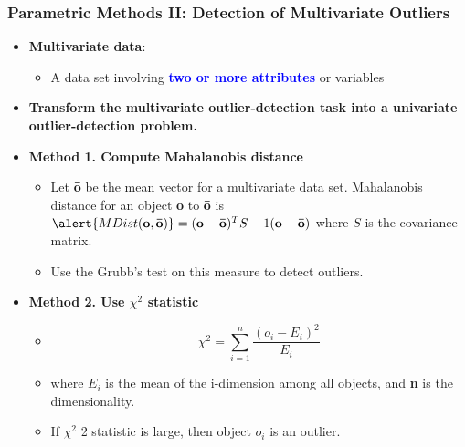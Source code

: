 \documentclass[aspectratio=169,t,xcolor=dvipsnames]{beamer}
\newcommand{\blue}[1]{\textbf{\textcolor{blue}{#1}}}
\begin{document}
\begin{frame}
	\frametitle{Parametric Methods II: Detection of Multivariate Outliers}
	\begin{itemize}
		\item \textbf{Multivariate data}:
		      \begin{itemize}
		      	\item A data set involving \blue{two or more attributes} or variables
		      \end{itemize}
		\item \textbf{Transform the multivariate outlier-detection task into a univariate outlier-detection problem.}
		\item \textbf{Method 1. Compute Mahalanobis distance}
		      \begin{itemize}
		      	\item Let \textbf{\alert{ō}} be the mean vector for a multivariate data set. Mahalanobis distance for an object \textbf{\alert{o}} to \textbf{ō} is $\alert{MDist(\textbf{o}, \textbf{ō})} = (\textbf{o} - \textbf{ō})^T S-1 (\textbf{o} - \textbf{ō})$ where $S$ is the covariance matrix.
		      	\item Use the Grubb's test on this measure to detect outliers.
		      \end{itemize}
		\item \textbf{Method 2. Use $\chi^2$ statistic}
		      \begin{itemize}
		      	 \item $$\chi^2 = \sum^n_{i=1} \frac{(o_i-E_i)^2}{E_i} $$
		      	\item where $E_i$ is the mean of the i-dimension among all objects, and \textbf{\alert{n}} is the dimensionality.
		      	\item If $\chi^2$ 2 statistic is large, then object \textbf{$o_i$} is an outlier.
		      \end{itemize}
	\end{itemize}
\end{frame}

%
\end{document}
